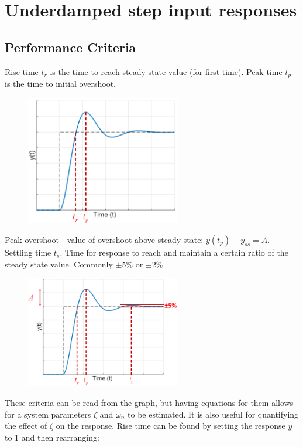 \documentclass[class=report, crop=false, 12pt,a4paper]{standalone}
\begin{document}
\section{Underdamped step input responses}
\subsection{Performance Criteria}
Rise time $t_r$ is the time to reach steady state value (for first time). Peak time $t_p$ is the time to initial overshoot.
\begin{figure}[H]
  \centering
  \includegraphics[width = 0.6\textwidth]{../img/diagram76.png}
\end{figure}
Peak overshoot - value of overshoot above steady state: $ y(t_p) - y_{ss} = A$. Settling time $t_s$. Time for response to reach and maintain a certain ratio of the steady state value. Commonly $\pm 5\%$ or $\pm 2\%$
\begin{figure}[H]
  \centering
  \includegraphics[width = 0.6\textwidth]{../img/diagram77.png}
\end{figure}
These criteria can be read from the graph, but having equations for them allows for a system parameters $\zeta$ and $\omega_n$ to be estimated. It is also useful for quantifying the effect of $\zeta$ on the response. Rise time can be found by setting the response $y$ to 1 and then rearranging:
\end{document}

